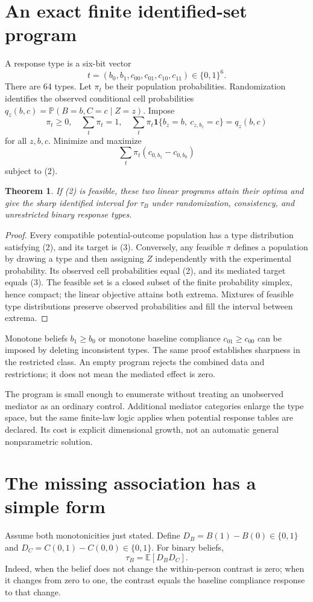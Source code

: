 \documentclass[11pt,a4paper]{article}
\newtheorem{theorem}{Theorem}[section]
\newcommand{\E}{\mathbb E}
\newcommand{\Prob}{\mathbb P}
\newcommand{\ind}{\mathbf 1}
\begin{document}
\section{An exact finite identified-set program}
A response type is a six-bit vector
\[
 t=(b_0,b_1,c_{00},c_{01},c_{10},c_{11})\in\{0,1\}^6.
\]
There are 64 types. Let $\pi_t$ be their population probabilities. Randomization identifies the observed conditional cell probabilities
$q_z(b,c)=\Prob(B=b,C=c\mid Z=z)$.
Impose
\[
 \pi_t\ge0,\quad \sum_t\pi_t=1,\quad
 \sum_t\pi_t\ind\{b_z=b,\ c_{z,b_z}=c\}=q_z(b,c)
 \tag{2}
\]
for all $z,b,c$. Minimize and maximize
\[
 \sum_t\pi_t(c_{0,b_1}-c_{0,b_0})
 \tag{3}
\]
subject to (2).
\begin{theorem}
If (2) is feasible, these two linear programs attain their optima and give the sharp identified interval for $\tau_B$ under randomization, consistency, and unrestricted binary response types.
\end{theorem}
\begin{proof}
Every compatible potential-outcome population has a type distribution satisfying (2), and its target is (3). Conversely, any feasible $\pi$ defines a population by drawing a type and then assigning $Z$ independently with the experimental probability. Its observed cell probabilities equal (2), and its mediated target equals (3). The feasible set is a closed subset of the finite probability simplex, hence compact; the linear objective attains both extrema. Mixtures of feasible type distributions preserve observed probabilities and fill the interval between extrema.
\end{proof}
Monotone beliefs $b_1\ge b_0$ or monotone baseline compliance $c_{01}\ge c_{00}$ can be imposed by deleting inconsistent types. The same proof establishes sharpness in the restricted class. An empty program rejects the combined data and restrictions; it does not mean the mediated effect is zero.

The program is small enough to enumerate without treating an unobserved mediator as an ordinary control. Additional mediator categories enlarge the type space, but the same finite-law logic applies when potential response tables are declared. Its cost is explicit dimensional growth, not an automatic general nonparametric solution.
\section{The missing association has a simple form}
Assume both monotonicities just stated. Define
$D_B=B(1)-B(0)\in\{0,1\}$ and
$D_C=C(0,1)-C(0,0)\in\{0,1\}$.
For binary beliefs,
\[
 \tau_B=\E[D_BD_C].
 \tag{4}
\]
Indeed, when the belief does not change the within-person contrast is zero; when it changes from zero to one, the contrast equals the baseline compliance response to that change.
\end{document}
